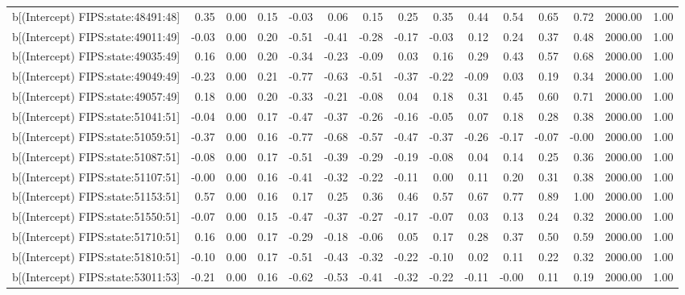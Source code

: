 \begin{table}[ht]
\begin{tabular}{rrrrrrrrrrrrrrr}
  b[(Intercept) FIPS:state:48491:48] & 0.35 & 0.00 & 0.15 & -0.03 & 0.06 & 0.15 & 0.25 & 0.35 & 0.44 & 0.54 & 0.65 & 0.72 & 2000.00 & 1.00 \\ 
  b[(Intercept) FIPS:state:49011:49] & -0.03 & 0.00 & 0.20 & -0.51 & -0.41 & -0.28 & -0.17 & -0.03 & 0.12 & 0.24 & 0.37 & 0.48 & 2000.00 & 1.00 \\ 
  b[(Intercept) FIPS:state:49035:49] & 0.16 & 0.00 & 0.20 & -0.34 & -0.23 & -0.09 & 0.03 & 0.16 & 0.29 & 0.43 & 0.57 & 0.68 & 2000.00 & 1.00 \\ 
  b[(Intercept) FIPS:state:49049:49] & -0.23 & 0.00 & 0.21 & -0.77 & -0.63 & -0.51 & -0.37 & -0.22 & -0.09 & 0.03 & 0.19 & 0.34 & 2000.00 & 1.00 \\ 
  b[(Intercept) FIPS:state:49057:49] & 0.18 & 0.00 & 0.20 & -0.33 & -0.21 & -0.08 & 0.04 & 0.18 & 0.31 & 0.45 & 0.60 & 0.71 & 2000.00 & 1.00 \\ 
  b[(Intercept) FIPS:state:51041:51] & -0.04 & 0.00 & 0.17 & -0.47 & -0.37 & -0.26 & -0.16 & -0.05 & 0.07 & 0.18 & 0.28 & 0.38 & 2000.00 & 1.00 \\ 
  b[(Intercept) FIPS:state:51059:51] & -0.37 & 0.00 & 0.16 & -0.77 & -0.68 & -0.57 & -0.47 & -0.37 & -0.26 & -0.17 & -0.07 & -0.00 & 2000.00 & 1.00 \\ 
  b[(Intercept) FIPS:state:51087:51] & -0.08 & 0.00 & 0.17 & -0.51 & -0.39 & -0.29 & -0.19 & -0.08 & 0.04 & 0.14 & 0.25 & 0.36 & 2000.00 & 1.00 \\ 
  b[(Intercept) FIPS:state:51107:51] & -0.00 & 0.00 & 0.16 & -0.41 & -0.32 & -0.22 & -0.11 & 0.00 & 0.11 & 0.20 & 0.31 & 0.38 & 2000.00 & 1.00 \\ 
  b[(Intercept) FIPS:state:51153:51] & 0.57 & 0.00 & 0.16 & 0.17 & 0.25 & 0.36 & 0.46 & 0.57 & 0.67 & 0.77 & 0.89 & 1.00 & 2000.00 & 1.00 \\ 
  b[(Intercept) FIPS:state:51550:51] & -0.07 & 0.00 & 0.15 & -0.47 & -0.37 & -0.27 & -0.17 & -0.07 & 0.03 & 0.13 & 0.24 & 0.32 & 2000.00 & 1.00 \\ 
  b[(Intercept) FIPS:state:51710:51] & 0.16 & 0.00 & 0.17 & -0.29 & -0.18 & -0.06 & 0.05 & 0.17 & 0.28 & 0.37 & 0.50 & 0.59 & 2000.00 & 1.00 \\ 
  b[(Intercept) FIPS:state:51810:51] & -0.10 & 0.00 & 0.17 & -0.51 & -0.43 & -0.32 & -0.22 & -0.10 & 0.02 & 0.11 & 0.22 & 0.32 & 2000.00 & 1.00 \\ 
  b[(Intercept) FIPS:state:53011:53] & -0.21 & 0.00 & 0.16 & -0.62 & -0.53 & -0.41 & -0.32 & -0.22 & -0.11 & -0.00 & 0.11 & 0.19 & 2000.00 & 1.00 \\ 

\end{tabular}
\end{table}
